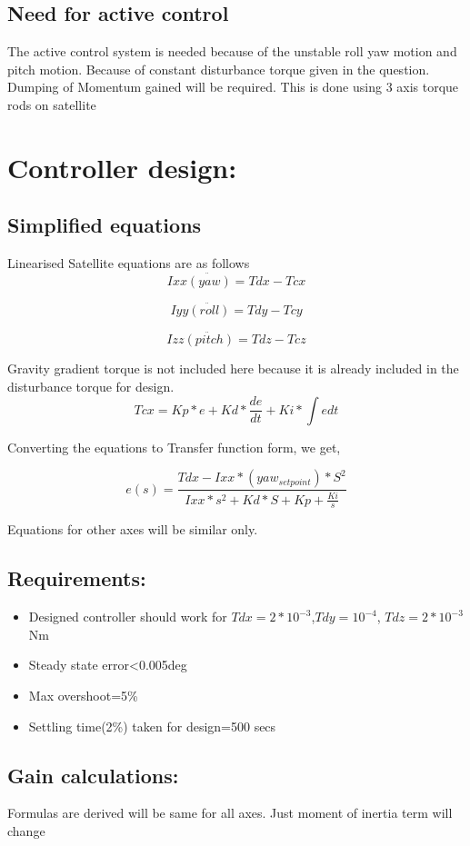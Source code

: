\documentclass[10pt,a4paper]{report}
\begin{document}
\section{Need for active control}
The active control system is needed because of the unstable roll yaw motion and pitch motion. Because of constant disturbance torque given in the question. Dumping of Momentum gained will be required. This is done using 3 axis torque rods on satellite
\chapter{Controller design:}
\section{Simplified equations}
Linearised Satellite equations are as follows
\[
Ixx\ddot{(yaw)}=Tdx-Tcx
\]

\[
Iyy\ddot{(roll)}=Tdy-Tcy
\]

\[
Izz\ddot{(pitch)}=Tdz-Tcz
\]

Gravity gradient torque is not included here because it is already
included in the disturbance torque for design. 
\[
Tcx=Kp*e+Kd*\dfrac{de}{dt}+Ki*\int edt
\]

Converting the equations to Transfer function form, we get,

\[
e(s)=\frac{Tdx-Ixx*(yaw_{setpoint})*S^{2}}{Ixx*s^{2}+Kd*S+Kp+\frac{Ki}{s}}
\]

Equations for other axes will be similar only.

\section{Requirements:}
\begin{itemize}
	\item Designed controller should work for $Tdx=2*10^{-3}$,$Tdy=10^{-4}$,
	$Tdz=2*10^{-3}$Nm
	\item Steady state error<0.005deg
	\item Max overshoot=5\%
	\item Settling time(2\%) taken for design=500 secs
\end{itemize}
\section{Gain calculations:}

Formulas are derived will be same for all axes. Just moment of inertia
term will change
\end{document}
